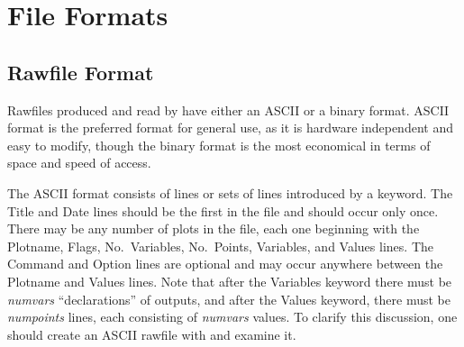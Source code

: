 \appendix
\chapter{File Formats}

\section{Rawfile Format}
\label{rawfilefmt}


Rawfiles produced and read by {\WRspice} have either an ASCII or a
binary format.  ASCII format is the preferred format for general use,
as it is hardware independent and easy to modify, though the binary
format is the most economical in terms of space and speed of access.

The ASCII format consists of lines or sets of lines introduced by a
keyword.  The {\vt Title} and {\vt Date} lines should be the first in
the file and should occur only once.  There may be any number of plots
in the file, each one beginning with the {\vt Plotname}, {\vt Flags},
{\vt No.~Variables}, {\vt No.~Points}, {\vt Variables}, and {\vt
Values} lines.  The {\vt Command} and {\vt Option} lines are optional
and may occur anywhere between the {\vt Plotname} and {\vt Values}
lines.  Note that after the {\vt Variables} keyword there must be {\it
numvars} ``declarations'' of outputs, and after the {\vt Values}
keyword, there must be {\it numpoints} lines, each consisting of {\it
numvars} values.  To clarify this discussion, one should create an
ASCII rawfile with {\WRspice} and examine it.

